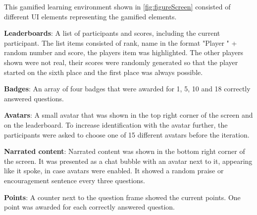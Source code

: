 This gamified learning environment shown in \autoref{fig:figureScreen} consisted of different UI elements representing the gamified elements.
\begin{APAitemize}
  \item \textbf{Leaderboards}: A list of participants and scores, including the current participant. The list items consisted of rank, name in the format "Player " + random number and score, the players item was highlighted. The other players shown were not real, their scores were randomly generated so that the player started on the sixth place and the first place was always possible.
  \item \textbf{Badges}: An array of four badges that were awarded for 1, 5, 10 and 18 correctly answered questions.
  \item \textbf{Avatars}: A small avatar that was shown in the top right corner of the screen and on the leaderboard. To increase identification with the avatar further, the participants were asked to choose one of 15 different avatars before the iteration.
  \item \textbf{Narrated content}: Narrated content was shown in the bottom right corner of the screen. It was presented as a chat bubble with an avatar next to it, appearing like it spoke, in case avatars were enabled. It showed a random praise or encouragement sentence every three questions.
  \item \textbf{Points}: A counter next to the question frame showed the current points. One point was awarded for each correctly answered question.
\end{APAitemize}

